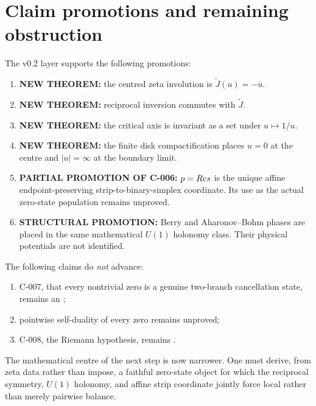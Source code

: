 \section{Claim promotions and remaining obstruction}
The v0.2 layer supports the following promotions:
\begin{enumerate}
\item \textbf{NEW THEOREM:} the centred zeta involution is $\widetilde J(u)=-\overline u$.
\item \textbf{NEW THEOREM:} reciprocal inversion commutes with $\widetilde J$.
\item \textbf{NEW THEOREM:} the critical axis is invariant as a set under $u\mapsto1/u$.
\item \textbf{NEW THEOREM:} the finite disk compactification places $u=0$ at the centre and $|u|=\infty$ at the boundary limit.
\item \textbf{PARTIAL PROMOTION OF C-006:} $p=Re s$ is the unique affine endpoint-preserving strip-to-binary-simplex coordinate.  Its use as the actual zero-state population remains unproved.
\item \textbf{STRUCTURAL PROMOTION:} Berry and Aharonov--Bohm phases are placed in the same mathematical $U(1)$ holonomy class.  Their physical potentials are not identified.
\end{enumerate}

The following claims do \emph{not} advance:
\begin{enumerate}
\item C-007, that every nontrivial zero is a genuine two-branch cancellation state, remains an ;
\item pointwise self-duality of every zero remains unproved;
\item C-008, the Riemann hypothesis, remains .
\end{enumerate}

The mathematical centre of the next step is now narrower.  One must derive, from zeta data rather than impose, a faithful zero-state object for which the reciprocal symmetry, $U(1)$ holonomy, and affine strip coordinate jointly force local rather than merely pairwise balance.
